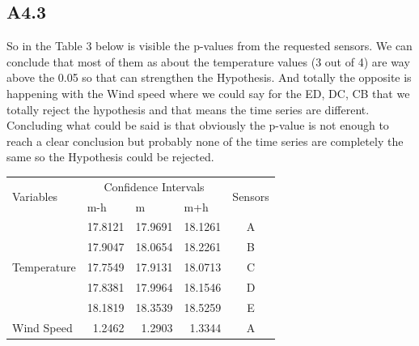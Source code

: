 \documentclass[a4paper,12pt]{article}
\begin{document}
 \subsection{A4.3}
 So in the Table 3 below is visible the p-values from the requested sensors. We can conclude that most of them as about the temperature values (3 out of 4) are way above the 0.05 so that can strengthen the Hypothesis. And totally the opposite is happening with the Wind speed where we could say for the ED, DC, CB that we totally reject the hypothesis and that means the time series are different. Concluding what could be said is that obviously the p-value is not enough to reach a clear conclusion but probably none of the time series are completely the same so the Hypothesis could be rejected.
 \begin{table}[]
	\centering
	\begin{tabular}{|l|r|r|r|c|}
		\hline
		\multirow{2}{*}{Variables}                         & \multicolumn{3}{c|}{Confidence Intervals}                                    & \multicolumn{1}{l|}{\multirow{2}{*}{Sensors}} \\ \cline{2-4}
		& \multicolumn{1}{l|}{m-h} & \multicolumn{1}{l|}{m} & \multicolumn{1}{l|}{m+h} & \multicolumn{1}{l|}{}                         \\ \hline
		\multicolumn{1}{|c|}{\multirow{5}{*}{Temperature}} & 17.8121                  & 17.9691                & 18.1261                  & A                                             \\ \cline{2-5} 
		\multicolumn{1}{|c|}{}                             & 17.9047                  & 18.0654                & 18.2261                  & B                                             \\ \cline{2-5} 
		\multicolumn{1}{|c|}{}                             & 17.7549                  & 17.9131                & 18.0713                  & C                                             \\ \cline{2-5} 
		\multicolumn{1}{|c|}{}                             & 17.8381                  & 17.9964                & 18.1546                  & D                                             \\ \cline{2-5} 
		\multicolumn{1}{|c|}{}                             & 18.1819                  & 18.3539                & 18.5259                  & E                                             \\ \hline
		\multirow{5}{*}{Wind Speed}                        & 1.2462                   & 1.2903                 & 1.3344                   & A                                             \\ \cline{2-5} 

\end{tabular}
\end{table}
\end{document}
